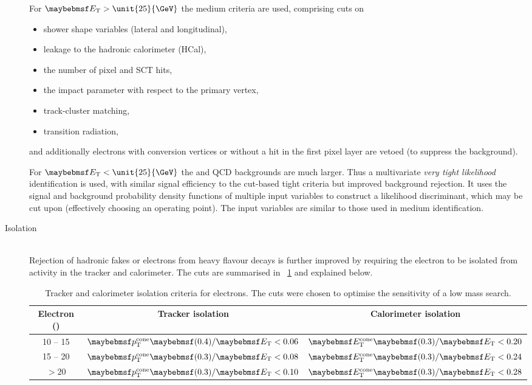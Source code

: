 \begin{description}
	For $\et > \unit{25}{\GeV}$ the medium criteria are used, comprising cuts on
	\begin{itemize}[noitemsep,nolistsep]
		\item shower shape variables (lateral and longitudinal),
		\item leakage to the hadronic calorimeter (HCal),
		\item the number of pixel and SCT hits,
		\item the impact parameter with respect to the primary vertex,
		\item track-cluster matching,
		\item transition radiation,
	\end{itemize}
	and additionally electrons with conversion vertices or without a hit in the first 
	pixel layer are vetoed (to suppress the \Wgamma background).
 
 	For $\et < \unit{25}{\GeV}$ the \Wjets and QCD backgrounds are much larger. Thus a 
 	multivariate \textit{very tight likelihood} identification is used, with similar 
 	signal efficiency to the cut-based tight criteria but improved background rejection. 
 	It uses the signal and background probability density functions of multiple input 
 	variables to construct a likelihood discriminant, which may be cut upon (effectively 
 	choosing an operating point). The input variables are similar to those used in 
 	medium identification.

\item[Isolation] \hfill \\
	Rejection of hadronic fakes or electrons from heavy flavour decays is further 
	improved by requiring the electron to be isolated from activity in the tracker and 
	calorimeter. The cuts are summarised in \Table~\ref{tab:objects:el_iso} and explained 
	below.

	\begin{table}[t]
		\begin{tabular}{c@{\hskip 0.3in}c@{\hskip 0.3in}c}
			\toprule
			Electron \et (\GeV) & Tracker isolation & Calorimeter isolation \\
			\midrule
			10 -- 15 & $\ptcone{0.4}/\et < 0.06$ & $\etcone{0.3}/\et < 0.20$ \\
			15 -- 20 & $\ptcone{0.3}/\et < 0.08$ & $\etcone{0.3}/\et < 0.24$ \\
			$> 20$   & $\ptcone{0.3}/\et < 0.10$ & $\etcone{0.3}/\et < 0.28$ \\
			\bottomrule
		\end{tabular}
		\caption{Tracker and calorimeter isolation criteria for electrons. The cuts 
		were chosen to optimise the sensitivity of a low mass \HWWlvlv search.}
		\label{tab:objects:el_iso}
	\end{table}


\end{description}
